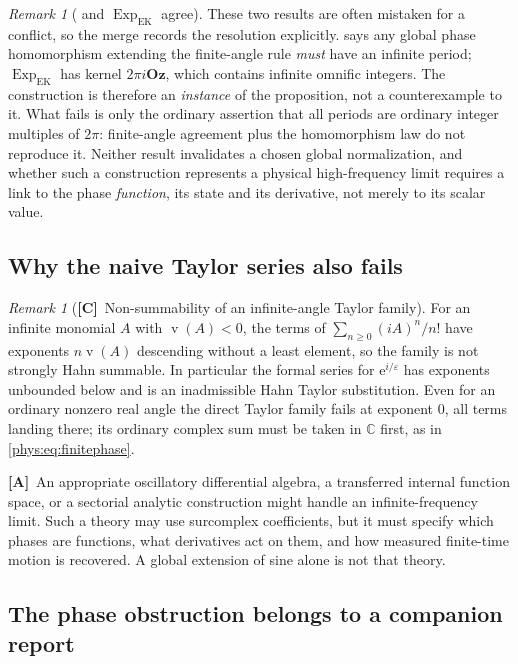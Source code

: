 \documentclass[11pt,letterpaper]{article}
\numberwithin{equation}{section}
\theoremstyle{definition}
\theoremstyle{remark}
\newtheorem{remark}[theorem]{Remark}
\newcommand{\C}{\mathbb C}
\newcommand{\eps}{\varepsilon}
\DeclareMathOperator{\val}{v}
\newcommand{\Oz}{\mathbf{Oz}}
\newcommand{\ee}{\mathrm e}
\newcommand{\ExpEK}{\operatorname{Exp}_{\mathrm{EK}}}
\newcommand{\TC}{\textcolor{TierC}{\textsf{\bfseries[C]}}}
\newcommand{\TA}{\textcolor{TierA}{\textsf{\bfseries[A]}}}
\begin{document}
\begin{remark}[ and $\ExpEK$ agree]
\label{phys:rem:periodsagree}
These two results are often mistaken for a conflict, so the merge records the
resolution explicitly.  says any global phase
homomorphism extending the finite-angle rule \emph{must} have an infinite
period; $\ExpEK$ has kernel $2\pi i\Oz$, which contains infinite omnific
integers. The construction is therefore an \emph{instance} of the proposition,
not a counterexample to it. What fails is only the ordinary assertion that all
periods are ordinary integer multiples of $2\pi$: finite-angle agreement plus
the homomorphism law do not reproduce it. Neither result invalidates a chosen
global normalization, and whether such a construction represents a physical
high-frequency limit requires a link to the phase \emph{function}, its state
and its derivative, not merely to its scalar value.
\end{remark}

\subsection{Why the naive Taylor series also fails}
\label{phys:sub:naivetaylor}

\begin{remark}[\TC\ Non-summability of an infinite-angle Taylor family]
\label{phys:rem:naivetaylor}
For an infinite monomial $A$ with $\val(A)<0$, the terms of
$\sum_{n\ge0}(iA)^{n}/n!$ have exponents $n\val(A)$ descending without a least
element, so the family is not strongly Hahn summable. In particular the formal
series for $\ee^{i/\eps}$ has exponents unbounded below and is an inadmissible
Hahn Taylor substitution. Even for an ordinary nonzero real angle the direct
Taylor family fails at exponent $0$, all terms landing there; its ordinary
complex sum must be taken in $\C$ first, as in \eqref{phys:eq:finitephase}.
\end{remark}

\TA\ An appropriate oscillatory differential algebra, a transferred internal
function space, or a sectorial analytic construction might handle an
infinite-frequency limit. Such a theory may use surcomplex coefficients, but
it must specify which phases are functions, what derivatives act on them, and
how measured finite-time motion is recovered. A global extension of sine alone
is not that theory.

\subsection{The phase obstruction belongs to a companion report}
\label{phys:sub:diffeqcite}
\end{document}
